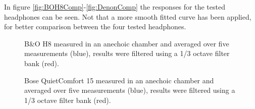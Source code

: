 
In figure \autoref{fig:BOH8Comp}-\autoref{fig:DenonComp} the responses for the tested headphones can be seen. Not that a more smooth fitted curve has been applied, for better comparison between the four tested headphones.

\begin{figure}[H]
	\centering
	
	\caption{B\&O H8 measured in an anechoic chamber and averaged over five measurements (blue), results were filtered using a 1/3 octave filter bank (red).}
	\label{fig:BOH8Comp}
\end{figure}

\begin{figure}[H]	
	\centering
	
	\caption{Bose QuietComfort 15 measured in an anechoic chamber and averaged over five measurements (blue), results were filtered using a 1/3 octave filter bank (red).}
	\label{fig:QC15Comp}
\end{figure}

